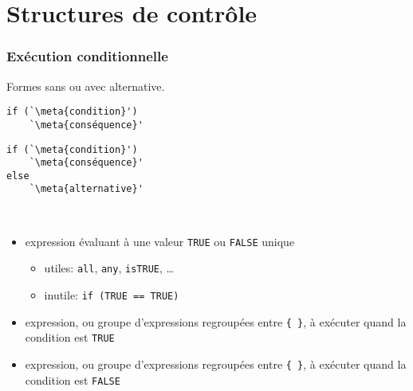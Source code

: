 \section{Structures de contrôle}

\begin{frame}[fragile=singleslide]
  \frametitle{Exécution conditionnelle}

  Formes sans ou avec \alert{alternative}.

  \begin{minipage}{\linewidth}
    \begin{minipage}[t]{0.48\linewidth}
      \begin{Schunk}
\begin{lstlisting}
if (`\meta{condition}')
    `\meta{conséquence}'
\end{lstlisting}
      \end{Schunk}
    \end{minipage}
    \begin{minipage}[t]{0.48\linewidth}
      \begin{Schunk}
\begin{lstlisting}
if (`\meta{condition}')
    `\meta{conséquence}'
else
    `\meta{alternative}'
\end{lstlisting}
      \end{Schunk}
    \end{minipage} \\
    \mbox{}
  \end{minipage}
  \begin{itemize}
  \item {} expression évaluant à une valeur
    \texttt{TRUE} ou \texttt{FALSE} \alert{unique}
    \begin{itemize}
    \item utiles: \verb=all=, \verb=any=,
      \verb=isTRUE=, \dots
    \item inutile: \verb|if (TRUE == TRUE)|
    \end{itemize}
  \item {} expression, ou groupe d'expressions
    regroupées entre \verb={ }=, à exécuter quand la condition est
    \texttt{TRUE}
  \item {} expression, ou groupe d'expressions
    regroupées entre \verb={ }=, à exécuter quand la condition est
    \texttt{FALSE}
  \end{itemize}
\end{frame}

